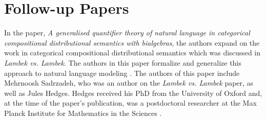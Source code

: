 \documentclass[11pt, reqno]{amsart}
\theoremstyle{plain}
\theoremstyle{definition}
\theoremstyle{example}
\begin{document}
\appendix
\section{Follow-up Papers}

\par
In the paper, \textit{A generalised quantifier theory of natural language in categorical compositional distributional semantics with bialgebras}, the authors expand on the work in categorical compositional distributional semantics which was discussed in \textit{Lambek vs. Lambek}. The authors in this paper formalize and generalize this approach to natural language modeling \cite{quantifier}. The authors of this paper include Mehrnoosh Sadrzadeh, who was an author on the \textit{Lambek vs. Lambek} paper, as well as Jules Hedges. Hedges received his PhD from the University of Oxford and, at the time of the paper's publication, was a postdoctoral researcher at the Max Planck Institute for Mathematics in the Sciences \cite{hedges}.
\end{document}
